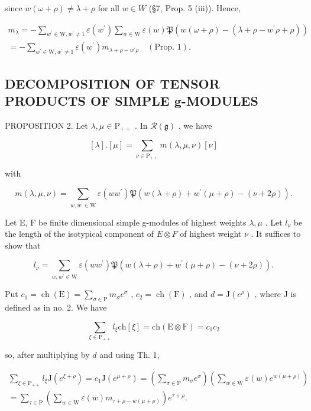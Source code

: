 since \(w(\omega + \rho) \neq \lambda + \rho\) for all \(w \in W\) (§7, Prop. 5 (iii)). Hence,

\[
\begin{array}{l} m _ {\lambda} = - \sum_ {w ^ {\prime} \in \mathrm{W}, w ^ {\prime} \neq 1} \varepsilon (w ^ {\prime}) \sum_ {w \in \mathrm{W}} \varepsilon (w) \mathfrak {P} (w (\omega + \rho) - (\lambda + \rho - w ^ {\prime} \rho + \rho)) \\ = - \sum_ {w ^ {\prime} \in \mathrm{W}, w ^ {\prime} \neq 1} \varepsilon (w ^ {\prime}) m _ {\lambda + \rho - w ^ {\prime} \rho} \quad (\text {Prop. 1}). \end{array}
\]

\subsection{DECOMPOSITION OF TENSOR PRODUCTS OF SIMPLE g-MODULES}

PROPOSITION 2. Let \(\lambda, \mu \in \mathrm{P}_{++}\) . In \(\mathcal{R}(\mathfrak{g})\) , we have

\[
[ \lambda ]. [ \mu ] = \sum_ {\nu \in \mathrm{P} _ {+ +}} m (\lambda , \mu , \nu) [ \nu ]
\]

with

\[
m (\lambda , \mu , \nu) = \sum_ {w, w ^ {\prime} \in \mathrm{W}} \varepsilon (w w ^ {\prime}) \mathfrak {P} (w (\lambda + \rho) + w ^ {\prime} (\mu + \rho) - (\nu + 2 \rho)).
\]

Let E, F be finite dimensional simple g-modules of highest weights \(\lambda, \mu\) . Let \(l_{\nu}\) be the length of the isotypical component of \(E \otimes F\) of highest weight \(\nu\) . It suffices to show that

\[
l _ {\nu} = \sum_ {w, w ^ {\prime} \in \mathrm{W}} \varepsilon (w w ^ {\prime}) \mathfrak {P} (w (\lambda + \rho) + w ^ {\prime} (\mu + \rho) - (\nu + 2 \rho)).\tag{2}
\]

Put \(c_{1} = \operatorname{ch}(\mathrm{E}) = \sum_{\sigma \in \mathrm{P}} m_{\sigma} e^{\sigma}\) , \(c_{2} = \operatorname{ch}(\mathrm{F})\) , and \(d = \mathrm{J}(e^{\rho})\) , where \(\mathrm{J}\) is defined as in no. 2. We have

\[
\sum_ {\xi \in \mathrm{P} _ {+ +}} l _ {\xi} \mathrm{ch} [ \xi ] = \mathrm{ch} (\mathrm{E} \otimes \mathrm{F}) = c _ {1} c _ {2}
\]

so, after multiplying by \(d\) and using Th. 1,

\[
\begin{array}{c} \sum_ {\xi \in \mathrm{P} _ {+ +}} l _ {\xi} \mathrm{J} (e ^ {\xi + \rho}) = c _ {1} \mathrm{J} (e ^ {\mu + \rho}) = \left(\sum_ {\sigma \in \mathrm{P}} m _ {\sigma} e ^ {\sigma}\right) \left(\sum_ {w \in \mathrm{W}} \varepsilon (w) e ^ {w (\mu + \rho)}\right) \\ = \sum_ {\tau \in \mathrm{P}} \left(\sum_ {w \in \mathrm{W}} \varepsilon (w) m _ {\tau + \rho - w (\mu + \rho)}\right) e ^ {\tau + \rho}. \end{array}\tag{3}
\]

